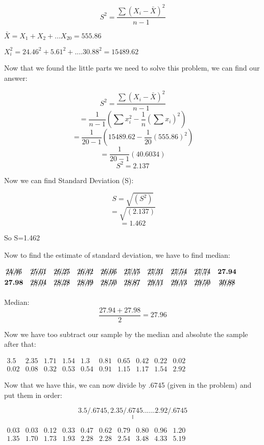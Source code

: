 \documentclass{article}
\begin{document}
$$S^{2}=\frac{\sum(X_{i}-\bar{X})^2}{n-1}$$


$\bar{X}=X_{1}+X_{2}+...X_{20}= 555.86$

$X_{i}^{2}=24.46^{2}+5.61^{2}+....30.88^{2}=15489.62$

Now that we found the little parts we need to solve this problem, we can find our answer:


$$S^{2}=\frac{\sum(X_{i}-\bar{X})^2}{n-1}$$
$$=\frac{1}{n-1}(\sum x_{i}^{2} -\frac{1}{n}(\sum x_{i})^2)$$
$$=\frac{1}{20-1}(15489.62-\frac{1}{20}(555.86)^2)$$
$$=\frac{1}{20-1}(40.6034)$$
$$S^{2}=2.137$$

Now we can find Standard Deviation (S):

$$S=\sqrt{(S^{2})}$$
$$=\sqrt{(2.137)}$$
$$=1.462$$


So S=1.462

\vspace{2mm}
Now to find the estimate of standard deviation, we have to find median:

$\begin{matrix}
\xout{24.46} & \xout{25.61} & \xout{26.25} & \xout{26.42} & \xout{26.66}  & \xout{27.15} & \xout{27.31} & \xout{27.54} & \xout{27.74} & \textbf{27.94} \\
\textbf{27.98} & \xout{28.04} & \xout{28.28} & \xout{28.49} & \xout{28.50} & \xout{28.87} & \xout{29.11} & \xout{29.13} & \xout{29.50} & \xout{30.88}
\end{matrix}$
\vspace{2mm}

Median:$$\frac{27.94 + 27.98}{2}=27.96$$

Now we have too subtract our sample by the median and absolute the sample after that:
\vspace{2mm}

$\begin{matrix}
3.5 & 2.35 & 1.71 & 1.54 & 1.3  & 0.81 & 0.65 & 0.42 & 0.22 & 0.02\\
0.02 & 0.08 & 0.32 & 0.53 &0.54 & 0.91 & 1.15 & 1.17 & 1.54 & 2.92
\end{matrix}$

Now that we have this, we can now divide by .6745 (given in the problem) and put them in order:

$$3.5/.6745, 2.35/.6745......2.92/.6745$$
$$.$$
$$.$$
$$.$$
$$.$$

$\begin{matrix}
0.03 & 0.03 & 0.12 & 0.33 & 0.47  & 0.62 & 0.79 & 0.80 & 0.96 & 1.20\\
1.35 &1.70 & 1.73 & 1.93 & 2.28 & 2.28 & 2.54 & 3.48 & 4.33 &  5.19
\end{matrix}$
\end{document}
